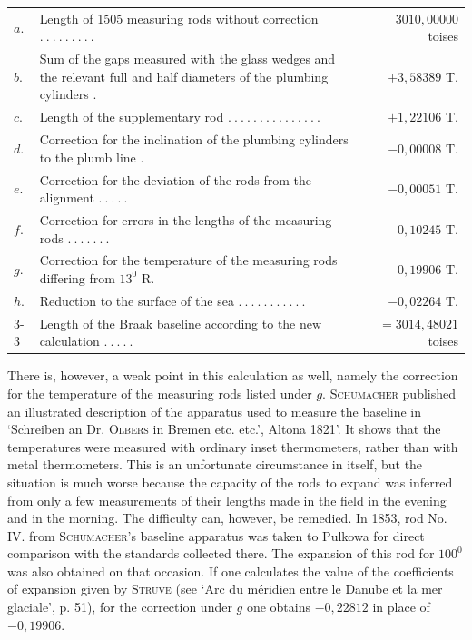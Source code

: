 %
\begin{center}
\begin{tabular}{@{}l p{.54\linewidth} r@{}}
\(a.\)&\raggedright Length of 1505 measuring rods without correction \(.\ .\ .\ .\ .\ .\ .\ .\ .\)&\(3010{,}00000\) toises\\
\(b.\)&\raggedright Sum of the gaps measured with the glass wedges and the relevant full and half diameters of the plumbing cylinders \(.\)&\(+3{,}58389\) T.\\
\(c.\)&\raggedright Length of the supplementary rod \(.\ .\ .\ .\ .\ .\ .\ .\ .\ .\ .\ .\ .\ .\ .\)&\(+1{,}22106\) T.\\
\(d.\)&\raggedright Correction for the inclination of the plumbing cylinders to the plumb line \(.\)&\(-0{,}00008\) T.\\
\(e.\)&\raggedright Correction for the deviation of the rods from the alignment \(.\ .\ .\ .\ .\)&\(-0{,}00051\) T.\\
\(f.\)&\raggedright Correction for errors in the lengths of the measuring rods \(.\ .\ .\ .\ .\ .\ .\)&\(-0{,}10245\) T.\\
\(g.\)&\raggedright Correction for the temperature of the measuring rods differing from \(13^{0}\) R.&\(-0{,}19906\) T.\\
\(h.\)&\raggedright Reduction to the surface of the sea \(.\ .\ .\ .\ .\ .\ .\ .\ .\ .\ .\)&\(-0{,}02264\) T.\\\cline{3-3}
&\raggedright Length of the Braak baseline according to the new calculation \(.\ .\ .\ .\ .\)&\(=3014{,}48021\) toises
\end{tabular}
\end{center}

There is, however, a weak point in this calculation as well, namely the correction for the temperature of the measuring rods listed under \(g\). \textsc{Schumacher} published an illustrated description of the apparatus used to measure the baseline in ‘Schreiben an Dr. \textsc{Olbers} in Bremen etc. etc.’, Altona 1821’. It shows that the temperatures were measured with ordinary inset thermometers, rather than with metal thermometers. This is an unfortunate circumstance in itself, but the situation is much worse because the capacity of the rods to expand was inferred from only a few measurements of their lengths made in the field in the evening and in the morning. The difficulty can, however, be remedied. In 1853, rod No. IV. from \textsc{Schumacher}’s baseline apparatus was taken to Pulkowa for direct comparison with the standards collected there. The expansion of this rod for \(100^{0}\) was also obtained on that occasion. If one calculates the value of the coefficients of expansion given by \textsc{Struve} (see ‘Arc du méridien entre le Danube et la mer glaciale’, p. 51), for the correction under \(g\) one obtains \(-0{,}22812\) in place of \(-0{,}19906\).

